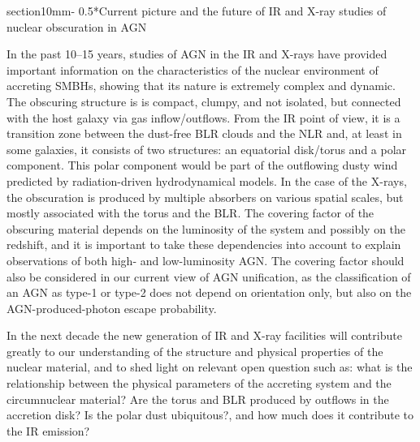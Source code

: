 \documentclass{natureprintstyle}
\makeatletter
\renewcommand{\section}{\@startsection%
{section}{1}{0mm}{-\baselineskip}%
{0.5\baselineskip}{\normalfont\Large\bfseries}}%
\makeatother
\begin{document}


\section*{Current picture and the future of IR and X-ray studies of nuclear obscuration in AGN}



In the past 10--15 years, studies of AGN in the IR and X-rays have provided important information on the characteristics of the nuclear environment of accreting SMBHs, 
showing that its nature is extremely complex and dynamic. {The obscuring structure is is compact, clumpy, and not isolated, but connected with the host galaxy via gas inflow/outflows.} 
From the IR point of view, it is a transition zone between the dust-free BLR clouds and the NLR and, at least in some galaxies, it consists of two structures: an equatorial disk/torus 
and a polar component. This polar component would be part of the outflowing dusty wind predicted by radiation-driven hydrodynamical models. In the case of the X-rays, the obscuration 
is produced by multiple absorbers on various spatial scales, but mostly associated with the torus and the BLR. The covering factor of the obscuring material depends on the luminosity 
of the system and possibly on the redshift, and it is important to take these dependencies into account to explain observations of both high- and low-luminosity AGN. The covering 
factor should also be considered in our current view of AGN unification, as the classification of an AGN as type-1 or type-2 does not depend on orientation only, but also on the 
AGN-produced-photon escape probability. 


In the next decade the new generation of IR and X-ray facilities will {contribute greatly to our} understanding of the structure and physical properties of the nuclear material, and to shed light on relevant open question such as: what is the relationship between the physical parameters of the accreting system and the circumnuclear material? Are the torus and BLR produced by outflows in the accretion disk? Is the polar dust ubiquitous?, and how much does it contribute to the IR emission? 
\end{document}
